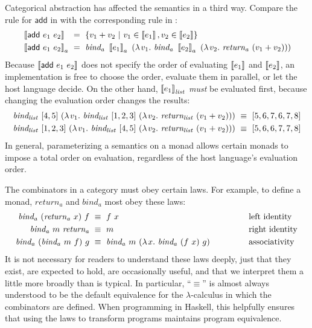 Categorical abstraction has affected the semantics in a third way.
Compare the rule for $\mathsf{add}$ in  with the corresponding rule in :
\begin{equation}
\begin{aligned}
	&\meaningof{\mathsf{add}~e_1~e_2} &&\!\!\!\!=\ \setb{v_1 + v_2}{v_1 \in \meaningof{e_1}, v_2 \in \meaningof{e_2}}
\\
	&\meaningof{\mathsf{add}~e_1~e_2}_a &&\!\!\!\!=\ \mathit{bind_a}~\meaningof{e_1}_a~(\fun{v_1} \mathit{bind_a}~\meaningof{e_2}_a~(\fun{v_2} \mathit{return_a}~(v_1 + v_2)))
\end{aligned}
\end{equation}
Because $\left\llbracket{\mathsf{add}~e_1~e_2}\right\rrbracket$ does not specify the order of evaluating $\left\llbracket{e_1}\right\rrbracket$ and $\left\llbracket{e_2}\right\rrbracket$, an implementation is free to choose the order, evaluate them in parallel, or let the host language decide.
On the other hand, $\left\llbracket{e_1}\right\rrbracket_\mathit{list}$ \emph{must} be evaluated first, because changing the evaluation order changes the results:
\begin{equation}
\begin{aligned}
	\mathit{bind_{list}}~[4,5]~(\lambda\mspace{2mu}{v_1}\ldotp\, \mathit{bind_{list}}~[1,2,3]~(\lambda\mspace{2mu}{v_2}\ldotp\, \mathit{return_{list}}~(v_1 + v_2)))&\ \equiv\ [5,6,7,6,7,8]
\\
	\mathit{bind_{list}}~[1,2,3]~(\lambda\mspace{2mu}{v_1}\ldotp\, \mathit{bind_{list}}~[4,5]~(\lambda\mspace{2mu}{v_2}\ldotp\, \mathit{return_{list}}~(v_1 + v_2)))&\ \equiv\ [5,6,6,7,7,8]
\end{aligned}
\end{equation}
In general, parameterizing a semantics on a monad allows certain monads to impose a total order on evaluation, regardless of the host language's evaluation order.

The combinators in a category must obey certain laws.
For example, to define a monad, $\mathit{return_a}$ and $\mathit{bind_a}$ most obey these laws:
\begin{equation}
\begin{aligned}
	\mathit{bind_a}~(\mathit{return_a}~x)~f&\ \equiv\ f~x
		&&\text{left identity}
\\
	\mathit{bind_a}~m~\mathit{return_a}&\ \equiv\ m
		&&\text{right identity}
\\
	\mathit{bind_a}~(\mathit{bind_a}~m~f)~g&\ \equiv\ \mathit{bind_a}~m~(\fun{x} \mathit{bind_a}~(f~x)~g)
		\hspace{0.5in}&&\text{associativity}
\end{aligned}
\end{equation}
It is not necessary for readers to understand these laws deeply, just that they exist, are expected to hold, are occasionally useful, and that we interpret them a little more broadly than is typical.
In particular, ``$\equiv$'' is almost always understood to be the default equivalence for the $\lambda$-calculus in which the combinators are defined.
When programming in Haskell, this helpfully ensures that using the laws to transform programs maintains program equivalence.

